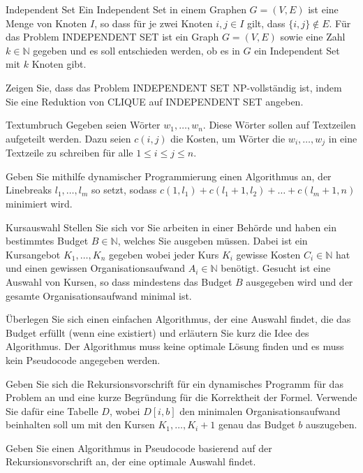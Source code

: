 \documentclass{article}
\begin{document}
\begin{exercise}{Independent Set}
  Ein Independent Set in einem Graphen $G = (V, E)$ ist eine Menge von Knoten $I$, so dass für je zwei Knoten $i, j \in I$ gilt, dass $\{i, j\} \notin E$. Für das Problem INDEPENDENT SET ist ein Graph $G = (V, E)$ sowie eine Zahl $k \in \mathbb{N}$ gegeben und es soll entschieden werden, ob es in $G$ ein Independent Set mit $k$ Knoten gibt.\par
  Zeigen Sie, dass das Problem INDEPENDENT SET NP-vollständig ist, indem Sie eine Reduktion von CLIQUE auf INDEPENDENT SET angeben.
\end{exercise}

\begin{exercise}{Textumbruch}
  Gegeben seien Wörter $w_1, \ldots, w_n$. Diese Wörter sollen auf Textzeilen aufgeteilt werden. Dazu seien $c(i, j)$ die Kosten, um Wörter die $w_i, \ldots, w_j$ in eine Textzeile zu schreiben für alle $1 \leq i \leq j \leq n$.\par
  Geben Sie mithilfe dynamischer Programmierung einen Algorithmus an, der Linebreaks $l_1, \ldots, l_m$ so setzt, sodass $c(1,l_1)+c(l_1 +1,l_2)+\ldots+c(l_m +1,n)$ minimiert wird.
\end{exercise}

\begin{eexercises}{Kursauswahl}{
    Stellen Sie sich vor Sie arbeiten in einer Behörde und haben ein bestimmtes Budget $B \in \mathbb{N}$, welches Sie ausgeben müssen. Dabei ist ein Kursangebot $K_1, \ldots, K_n$ gegeben wobei jeder Kurs $K_i$ gewisse Kosten $C_i \in \mathbb{N}$ hat und einen gewissen Organisationsaufwand $A_i \in \mathbb{N}$ benötigt. Gesucht ist eine Auswahl von Kursen, so dass mindestens das Budget $B$ ausgegeben wird und der gesamte Organisationsaufwand minimal ist.
  }
  \item Überlegen Sie sich einen einfachen Algorithmus, der eine Auswahl findet, die das Budget erfüllt (wenn eine existiert) und erläutern Sie kurz die Idee des Algorithmus. Der Algorithmus muss keine optimale Lösung finden und es muss kein Pseudocode angegeben werden.
  \item Geben Sie sich die Rekursionsvorschrift für ein dynamisches Programm für das Problem an und eine kurze Begründung für die Korrektheit der Formel. Verwende Sie dafür eine Tabelle $D$, wobei $D[i, b]$ den minimalen Organisationsaufwand beinhalten soll um mit den Kursen $K_1, \ldots, K_i+1$ genau das Budget $b$ auszugeben.
  \item Geben Sie einen Algorithmus in Pseudocode basierend auf der Rekursionsvorschrift an, der eine optimale Auswahl findet.
\end{eexercises}
\end{document}
